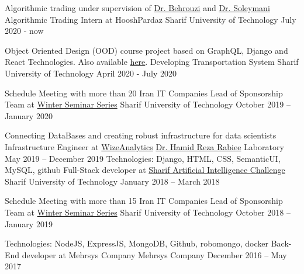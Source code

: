
\begin{cventries}
	
  \cventry
  	{Algorithmic trading under supervision of \href{http://ee.sharif.edu/~behroozi}{Dr. Behrouzi} and \href{http://sharif.edu/~soleymani/}{Dr. Soleymani}}
  	{Algorithmic Trading Intern at HooshPardaz}
  	{Sharif University of Technology}
	{July 2020 - now}
	{}
	
	\cventry
	{Object Oriented Design (OOD) course project based on GraphQL, Django and React Technologies. Also available \href{https://github.com/mostafaghadimi/OOD_Project}{here}.}
	{Developing Transportation System}
	{Sharif University of Technology}
	{April 2020 - July 2020}
	{}

  \cventry
	{Schedule Meeting with more than 20 Iran IT Companies}
	{Lead of Sponsorship Team at \href{https://wss.ce.sharif.edu/2019/staff/}{Winter Seminar Series}}
	{Sharif University of Technology}
	{October 2019 – January 2020}
	{}
	
  \cventry
	{Connecting DataBases and creating robust infrastructure for data scientists}
	{Infrastructure Engineer at \href{http://wizeanalytics.com/}{WizeAnalytics}}
	{\href{http://sharif.edu/~rabiee/}{Dr. Hamid Reza Rabiee} Laboratory}
	{May 2019 – December 2019}
	{}
  \cventry
    {Technologies: Django, HTML, CSS, SemanticUI, MySQL, github}
    {Full-Stack developer at \href{https://aichallenge.sharif.edu/}{Sharif Artificial Intelligence Challenge}}
    {Sharif University of Technology}
    {January 2018 – March 2018}
    {}
    
      \cventry
    {Schedule Meeting with more than 15 Iran IT Companies}
    {Lead of Sponsorship Team at \href{https://wss.ce.sharif.edu/2018/staff/}{Winter Seminar Series}}
    {Sharif University of Technology}
    {October 2018 – January 2019}
    {}
    
  \cventry
    {Technologies: NodeJS, ExpressJS, MongoDB, Github, robomongo, docker}
    {Back-End developer at Mehrsys Company}
    {Mehrsys Company}
    {December 2016 – May 2017}
    {}
    
  
\end{cventries}
